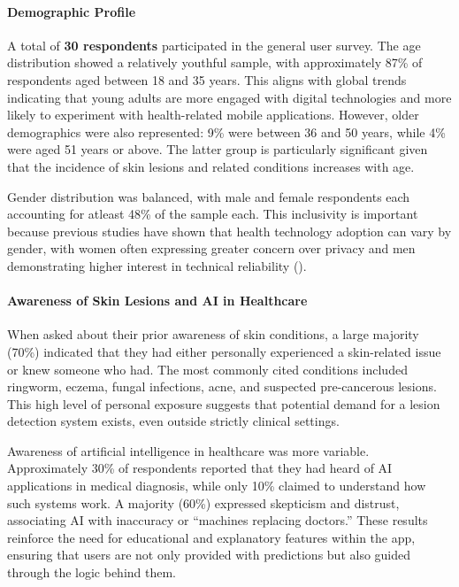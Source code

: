 \documentclass[
  12pt,
  oneside]{article}
\begin{document}
\paragraph{Demographic Profile}\label{demographic-profile}

A total of \textbf{30 respondents} participated in the general user
survey. The age distribution showed a relatively youthful sample, with
approximately 87\% of respondents aged between 18 and 35 years. This
aligns with global trends indicating that young adults are more engaged
with digital technologies and more likely to experiment with
health-related mobile applications. However, older demographics were
also represented: 9\% were between 36 and 50 years, while 4\% were aged
51 years or above. The latter group is particularly significant given
that the incidence of skin lesions and related conditions increases with
age.

Gender distribution was balanced, with male and female respondents each
accounting for atleast 48\% of the sample each. This inclusivity is
important because previous studies have shown that health technology
adoption can vary by gender, with women often expressing greater concern
over privacy and men demonstrating higher interest in technical
reliability ().

\paragraph{Awareness of Skin Lesions and AI in
Healthcare}\label{awareness-of-skin-lesions-and-ai-in-healthcare}

When asked about their prior awareness of skin conditions, a large
majority (70\%) indicated that they had either personally experienced a
skin-related issue or knew someone who had. The most commonly cited
conditions included ringworm, eczema, fungal infections, acne, and
suspected pre-cancerous lesions. This high level of personal exposure
suggests that potential demand for a lesion detection system exists,
even outside strictly clinical settings.

Awareness of artificial intelligence in healthcare was more variable.
Approximately 30\% of respondents reported that they had heard of AI
applications in medical diagnosis, while only 10\% claimed to understand
how such systems work. A majority (60\%) expressed skepticism and
distrust, associating AI with inaccuracy or ``machines replacing
doctors.'' These results reinforce the need for educational and
explanatory features within the app, ensuring that users are not only
provided with predictions but also guided through the logic behind them.
\end{document}
